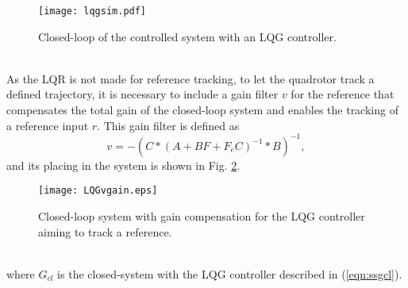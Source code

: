 	\begin{figure}[h]
	\begin{center}
	\texttt{[image: lqgsim.pdf]}   
	\caption{Closed-loop of the controlled system with an LQG controller.}
	\label{fig:lqgsim}
	\end{center}
	\end{figure}
\\As the LQR is not made for reference tracking, to let the quadrotor track a defined trajectory, it is necessary to include a gain filter $v$ for the reference that compensates the total gain of the closed-loop system and enables the tracking of a reference input $r$. This gain filter is defined as
	\begin{equation}\label{eqn:v}
	v = -(C*(A+BF+F_{e}C)^{-1}*B)^{-1},
	\end{equation}
and its placing in the system is shown in Fig. \ref{fig:vcompensation}.
	\begin{figure}[h]
	\begin{center}
	\texttt{[image: LQGvgain.eps]}
	\caption{Closed-loop system with gain compensation for the LQG controller aiming to track a reference.}
	\label{fig:vcompensation}
	\end{center}
	\end{figure}
\\where $G_{cl}$ is the closed-system with the LQG controller described in (\ref{eqn:ssgcl}).

